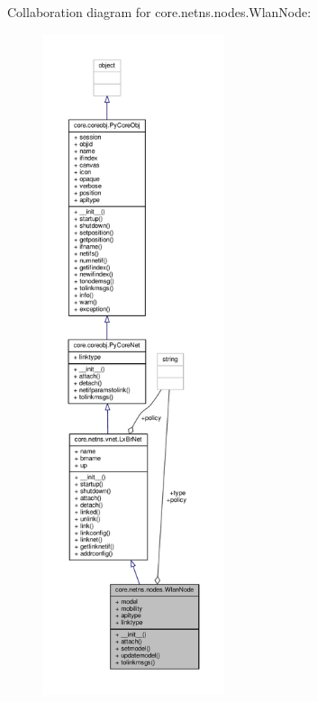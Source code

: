 Collaboration diagram for core.\+netns.\+nodes.\+Wlan\+Node\+:
\nopagebreak
\begin{figure}[H]
\begin{center}
\leavevmode
\includegraphics[height=550pt]{classcore_1_1netns_1_1nodes_1_1_wlan_node__coll__graph}
\end{center}
\end{figure}
